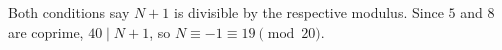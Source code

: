 Both conditions say $N+1$ is divisible by the respective modulus. Since $5$ and $8$ are coprime, $40\mid N+1$, so $N\equiv-1\equiv\boxed{19}\pmod{20}$.
